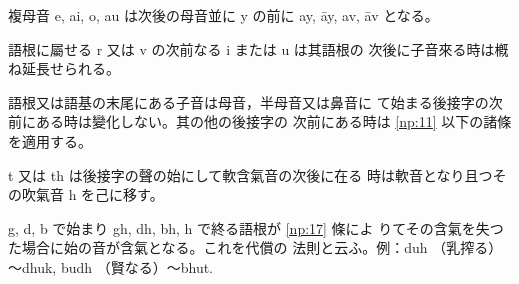\numberParagraph
複母音 e, ai, o, au は次後の母音並に y の前に ay, āy,
av, āv となる。

\numberParagraph
語根に屬せる r 又は v の次前なる i または u は其語根の
次後に子音來る時は槪ね延長せられる。

\numberParagraph
語根又は語基の末尾にある子音は母音，半母音又は鼻音に
て始まる後接字の次前にある時は變化しない。其の他の後接字の
次前にある時は \ref{np:11} 以下の諸條を適用する。

\numberParagraph
t 又は th は後接字の聲の始にして軟含氣音の次後に在る
時は軟音となり且つその吹氣音 h を己に移す。

\numberParagraph
g, d, b で始まり gh, dh, bh, h で終る語根が \ref{np:17} 條によ
りてその含氣を失つた場合に始の音が含氣となる。これを代償の
法則と云ふ。例：duh （乳搾る）～dhuk, budh （賢なる）～bhut.


\newpage
\def\enotesize{\normalsize}
\theendnotes

